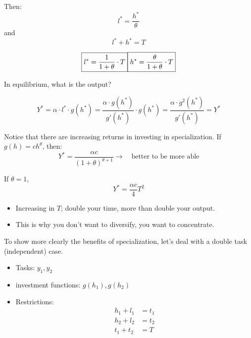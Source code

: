 \documentclass[14pt,notitlepage]{article}
\begin{document}
Then:
\begin{equation*}
\boxed{l^* = \frac{h^*}{\theta}}
\end{equation*}
and
\begin{equation*}
\boxed{l^* + h^* = T}
\end{equation*}

\begin{equation*}
\boxed{l^* = \frac{1}{1+\theta} \cdot T} \\
\boxed{h^* = \frac{\theta}{1+\theta} \cdot T}
\end{equation*}

In equilibrium, what is the output?

\begin{equation*}
Y^* = \alpha \cdot l^* \cdot g(h^*) = \frac{\alpha \cdot g(h^*)}{g'(h^*)} \cdot g(h^*) = \boxed{\frac{\alpha \cdot g^2(h^*)}{g'(h^*)} = Y^*}
\end{equation*}

Notice that there are increasing returns in investing in specialization.
If $g(h)=ch^{\theta}$, then:
\begin{equation*}
Y^* = \frac{\alpha c}{(1+\theta)^{\theta+1}} \rightarrow \quad \text{better to be more able}
\end{equation*}

If $\theta = 1$,
\begin{equation*}
\boxed{Y^* = \frac{\alpha c}{4} T^2}
\end{equation*}

\begin{itemize}
\item Increasing in $T$; double your time, more than double your output.
\item This is why you don't want to diversify, you want to concentrate.
\end{itemize}

To show more clearly the benefits of specialization, let's deal with a double task (independent) case.

\begin{itemize}
\item Tasks: $y_1, y_2$
\item investment functions: $g(h_1), g(h_2)$
\item Restrictions: \begin{align*}
                        h_1 + l_1 &= t_1 \\
                        h_2 + l_2 &= t_2 \\
                        t_1 + t_2 &= T
                    \end{align*}
\end{itemize}
\end{document}
